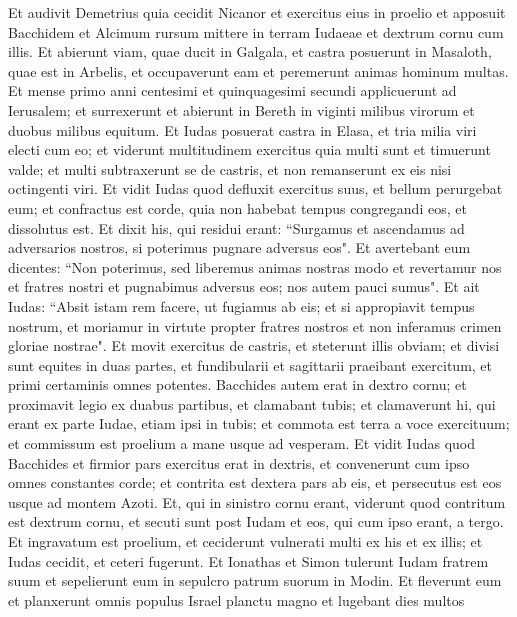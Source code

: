 \begin{biblechapter}  
\verse Et audivit Demetrius quia cecidit Nicanor et exercitus eius in proelio et apposuit Bacchidem et Alcimum rursum mittere in terram Iudaeae et dextrum cornu cum illis. 
\verse Et abierunt viam, quae ducit in Galgala, et castra posuerunt in Masaloth, quae est in Arbelis, et occupaverunt eam et peremerunt animas hominum multas. 
\verse Et mense primo anni centesimi et quinquagesimi secundi applicuerunt ad Ierusalem; 
\verse et surrexerunt et abierunt in Bereth in viginti milibus virorum et duobus milibus equitum. 
\verse Et Iudas posuerat castra in Elasa, et tria milia viri electi cum eo; 
\verse et viderunt multitudinem exercitus quia multi sunt et timuerunt valde; et multi subtraxerunt se de castris, et non remanserunt ex eis nisi octingenti viri. 
\verse Et vidit Iudas quod defluxit exercitus suus, et bellum perurgebat eum; et confractus est corde, quia non habebat tempus congregandi eos, 
\verse et dissolutus est. Et dixit his, qui residui erant: “Surgamus et ascendamus ad adversarios nostros, si poterimus pugnare adversus eos". 
\verse Et avertebant eum dicentes: “Non poterimus, sed liberemus animas nostras modo et revertamur nos et fratres nostri et pugnabimus adversus eos; nos autem pauci sumus". 
\verse Et ait Iudas: “Absit istam rem facere, ut fugiamus ab eis; et si appropiavit tempus nostrum, et moriamur in virtute propter fratres nostros et non inferamus crimen gloriae nostrae". 
\verse Et movit exercitus de castris, et steterunt illis obviam; et divisi sunt equites in duas partes, et fundibularii et sagittarii praeibant exercitum, et primi certaminis omnes potentes. 
\verse Bacchides autem erat in dextro cornu; et proximavit legio ex duabus partibus, et clamabant tubis; et clamaverunt hi, qui erant ex parte Iudae, etiam ipsi in tubis; 
\verse et commota est terra a voce exercituum; et commissum est proelium a mane usque ad vesperam. 
\verse Et vidit Iudas quod Bacchides et firmior pars exercitus erat in dextris, et convenerunt cum ipso omnes constantes corde; 
\verse et contrita est dextera pars ab eis, et persecutus est eos usque ad montem Azoti. 
\verse Et, qui in sinistro cornu erant, viderunt quod contritum est dextrum cornu, et secuti sunt post Iudam et eos, qui cum ipso erant, a tergo. 
\verse Et ingravatum est proelium, et ceciderunt vulnerati multi ex his et ex illis; 
\verse et Iudas cecidit, et ceteri fugerunt. 
\verse Et Ionathas et Simon tulerunt Iudam fratrem suum et sepelierunt eum in sepulcro patrum suorum in Modin. 
\verse Et fleverunt eum et planxerunt omnis populus Israel planctu magno et lugebant dies multos 

\end{biblechapter}
